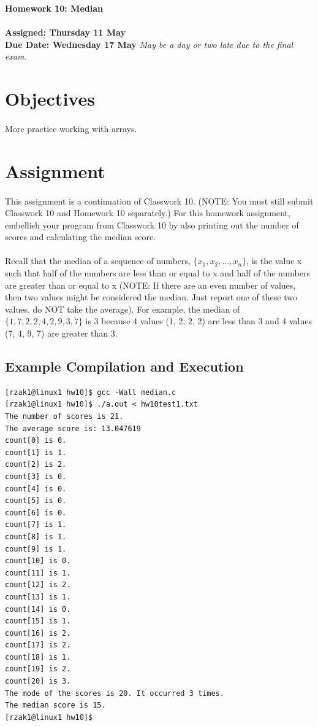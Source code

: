 \documentclass[letter,11pt]{article}
\begin{document}
\huge
\textbf{Homework 10: Median}
\normalsize
\\ ~~ \\
\textbf{Assigned: Thursday 11 May} \\
\textbf{Due Date: Wednesday 17 May}
\textit{May be a day or two late due to the final exam.}

\section*{Objectives}
\paragraph{}More practice working with arrays.

\section*{Assignment}
\paragraph{}This assignment is a continuation of Classwork 10. (NOTE: You must still submit Classwork 10 and Homework 10 separately.) For this homework assignment, embellish your program from Classwork 10 by also printing out the number of scores and calculating the median score.

\paragraph{}Recall that the median of a sequence of numbers, $\{x_1, x_2, \ldots, x_n\}$, is the value x such that half of the numbers are less than or equal to x and half of the numbers are greater than or equal to x (NOTE: If there are an even number of values, then two values might be considered the median. Just report one of these two values, do NOT take the average). For example, the median of $\{1, 7, 2, 2, 4, 2, 9, 3, 7\}$ is 3 because 4 values (1, 2, 2, 2) are less than 3 and 4 values (7, 4, 9, 7) are greater than 3.

\subsection*{Example Compilation and Execution}
\begin{verbatim}
[rzak1@linux1 hw10]$ gcc -Wall median.c
[rzak1@linux1 hw10]$ ./a.out < hw10test1.txt
The number of scores is 21.
The average score is: 13.047619
count[0] is 0.
count[1] is 1.
count[2] is 2.
count[3] is 0.
count[4] is 0.
count[5] is 0.
count[6] is 0.
count[7] is 1.
count[8] is 1.
count[9] is 1.
count[10] is 0.
count[11] is 1.
count[12] is 2.
count[13] is 1.
count[14] is 0.
count[15] is 1.
count[16] is 2.
count[17] is 2.
count[18] is 1.
count[19] is 2.
count[20] is 3.
The mode of the scores is 20. It occurred 3 times.
The median score is 15.
[rzak1@linux1 hw10]$
\end{verbatim}
\end{document}
